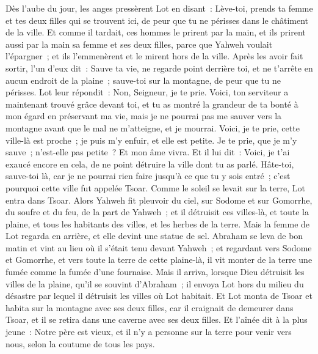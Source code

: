\begin{multicols}{2}
Dès l'aube du jour, les anges pressèrent Lot en disant~: Lève-toi, prends ta femme et tes deux filles qui se trouvent ici, de peur que tu ne périsses dans le châtiment de la ville.
Et comme il tardait, ces hommes le prirent par la main, et ils prirent aussi par la main sa femme et ses deux filles, parce que Yahweh voulait l'épargner~; et ils l'emmenèrent et le mirent hors de la ville.
Après les avoir fait sortir, l'un d'eux dit~: Sauve ta vie, ne regarde point derrière toi, et ne t'arrête en aucun endroit de la plaine~; sauve-toi sur la montagne, de peur que tu ne périsses.
Lot leur répondit~: Non, Seigneur, je te prie.
Voici, ton serviteur a maintenant trouvé grâce devant toi, et tu as montré la grandeur de ta bonté à mon égard en préservant ma vie, mais je ne pourrai pas me sauver vers la montagne avant que le mal ne m'atteigne, et je mourrai.
Voici, je te prie, cette ville-là est proche~; je puis m'y enfuir, et elle est petite. Je te prie, que je m'y sauve~; n'est-elle pas petite~? Et mon âme vivra.
Et il lui dit~: Voici, je t'ai exaucé encore en cela, de ne point détruire la ville dont tu as parlé.
Hâte-toi, sauve-toi là, car je ne pourrai rien faire jusqu'à ce que tu y sois entré~; c'est pourquoi cette ville fut appelée Tsoar.
Comme le soleil se levait sur la terre, Lot entra dans Tsoar.
Alors Yahweh fit pleuvoir du ciel, sur Sodome et sur Gomorrhe, du soufre et du feu, de la part de Yahweh~;
et il détruisit ces villes-là, et toute la plaine, et tous les habitants des villes, et les herbes de la terre.
Mais la femme de Lot regarda en arrière, et elle devint une statue de sel.
Abraham se leva de bon matin et vint au lieu où il s'était tenu devant Yahweh~;
et regardant vers Sodome et Gomorrhe, et vers toute la terre de cette plaine-là, il vit monter de la terre une fumée comme la fumée d'une fournaise.
Mais il arriva, lorsque Dieu détruisit les villes de la plaine, qu'il se souvint d'Abraham~; il envoya Lot hors du milieu du désastre par lequel il détruisit les villes où Lot habitait.
Et Lot monta de Tsoar et habita sur la montagne avec ses deux filles, car il craignait de demeurer dans Tsoar, et il se retira dans une caverne avec ses deux filles.
Et l'aînée dit à la plus jeune~: Notre père est vieux, et il n'y a personne sur la terre pour venir vers nous, selon la coutume de tous les pays.

\end{multicols}
